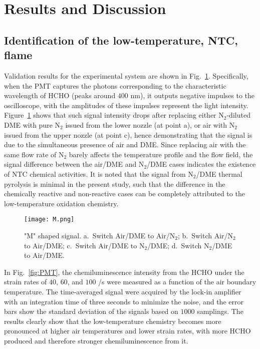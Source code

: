 \documentclass[review,3p,times]{elsarticleUS}
\begin{document}
\section{Results and Discussion}
\subsection{Identification of the low-temperature, NTC, flame} \label{sec:4.1}

Validation results for the experimental system are shown in Fig.~\ref{fig:M}.  Specifically, when the PMT captures the photons corresponding to the characteristic wavelength of HCHO (peaks around $400$ nm), it outputs negative impulses to the oscilloscope, with the amplitudes of these impulses represent the light intensity.  Figure~\ref{fig:M} shows that such signal intensity drops after replacing either N$_2$-diluted DME with pure N$_2$ issued from the lower nozzle (at point a), or air with N$_2$ issued from the upper nozzle (at point c), hence demonstrating that the signal is due to the simultaneous presence of air and DME.  Since replacing air with the same flow rate of N$_2$ barely affects the temperature profile and the flow field, the signal difference between the air/DME and N$_2$/DME cases indicates the existence of NTC chemical activities.  It is noted that the signal from N$_2$/DME thermal pyrolysis is minimal in the present study, such that the difference in the chemically reactive and non-reactive cases can be completely attributed to the low-temperature oxidation chemistry.  


\begin{figure}[t]
  \centering
  \scriptsize
  \vspace{-0.1in}
  \texttt{[image: M.png]}
  \normalsize
  \caption{"M" shaped signal. a.~Switch Air/DME to Air/N$_2$; b.~Switch Air/N$_2$ to Air/DME; c.~Switch Air/DME to N$_2$/DME; d.~Switch N$_2$/DME to Air/DME.}
  \label{fig:M}
\end{figure}

In Fig.~\ref{fig:PMT}, the chemiluminescence intensity from the HCHO under the strain rates of $40$, $60$, and $100$ /s were measured as a function of the air boundary temperature.  The time-averaged signal were acquired by the lock-in amplifier with an integration time of three seconds to minimize the noise, and the error bars show the standard deviation of the signals based on $1000$ samplings. The results clearly show that the low-temperature chemistry becomes more pronounced at higher air temperatures and lower strain rates, with more HCHO produced and therefore stronger chemiluminescence from it.
\end{document}
